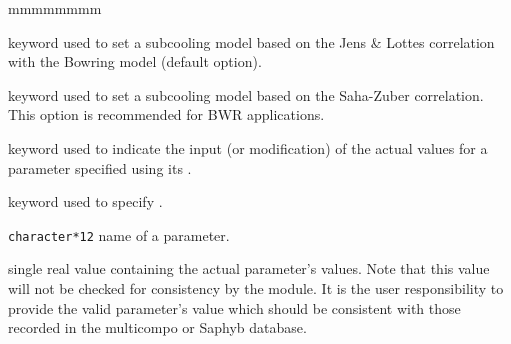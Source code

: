 \begin{ListeDeDescription}{mmmmmmmm}
\item[\moc{BOWR}] keyword used to set a subcooling model based on the Jens \& Lottes correlation\cite{jenslottes} with the Bowring model\cite{bowring} (default option).

\item[\moc{SAHA}] keyword used to set a subcooling model based on the Saha-Zuber correlation\cite{lahey}. This option is recommended for BWR applications.

\item[\moc{SET-PARAM}] keyword used to indicate the input (or modification)
of the actual values for a parameter specified using its .

\item[\moc{PNAME}] keyword used to specify .

\item[\dusa{PNAME}] \texttt{character*12} name of a parameter.

\item[\dusa{pvalue}] single real value containing the actual
parameter's values. Note that this value will not be checked for consistency
by the module. It is the user responsibility to provide the valid parameter's value
which should be consistent with those recorded in the multicompo or Saphyb database.

\end{ListeDeDescription}
\clearpage
